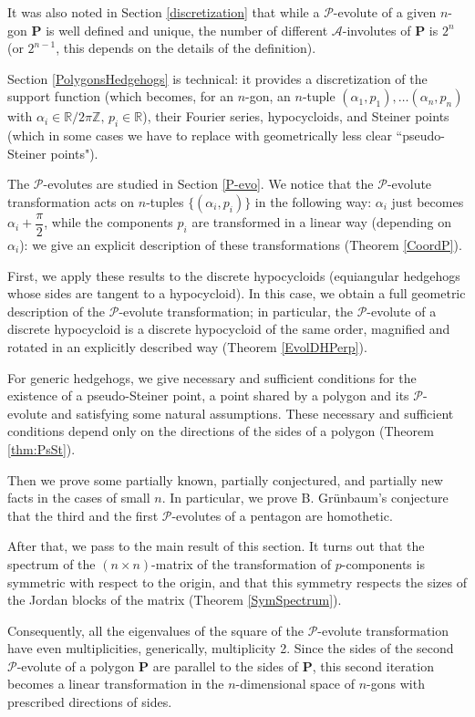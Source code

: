 \documentclass[12pt]{article}
\newcommand{\Pev}{\mathcal{P}}
\newcommand{\Aev}{\mathcal{A}}
\renewcommand{\P}{\mathbf{P}}
\begin{document}
It was also noted in Section \ref{discretization} that while a $\Pev$-evolute of a given $n$-gon $\P$ is well defined and unique, the number of different $\Aev$-involutes of $\P$ is $2^n$ (or $2^{n-1}$, this depends on the details of the definition).

Section \ref{PolygonsHedgehogs} is technical: it provides a discretization of the support function (which becomes, for an $n$-gon, an $n$-tuple $(\alpha_1,p_1),\dots(\alpha_n,p_n)$ with $\alpha_i\in{\mathbb R}/2\pi{\mathbb Z},\, p_i\in\mathbb R$), their Fourier series, hypocycloids, and Steiner points (which in some cases we have to replace with geometrically less clear ``pseudo-Steiner points"). 

The $\Pev$-evolutes are studied in Section \ref{P-evo}. We notice that the $\Pev$-evolute transformation acts on  $n$-tuples $\{(\alpha_i,p_i)\}$ in the following way: $\alpha_i$ just becomes $\alpha_i+\dfrac{\pi}2$, while the components $p_i$ are transformed in a linear way (depending on $\alpha_i$): we give an explicit description of these transformations (Theorem \ref{CoordP}). 

First, we apply these results to the discrete hypocycloids (equiangular hedgehogs whose sides are tangent to a hypocycloid). In this case, we obtain a full geometric description of the $\Pev$-evolute transformation; in particular, the $\Pev$-evolute of a discrete hypocycloid is a discrete hypocycloid of the same order, magnified and rotated in an explicitly described way (Theorem \ref{EvolDHPerp}). 

For generic hedgehogs, we give  necessary and sufficient conditions for the existence of a pseudo-Steiner point, a point shared by a polygon and its $\Pev$-evolute and satisfying some natural assumptions. These necessary and sufficient conditions depend only on the directions of the sides of a polygon (Theorem \ref{thm:PsSt}).

Then we prove some partially known, partially conjectured, and partially new facts in the cases of small $n$. In particular, we prove B. Gr\"unbaum's conjecture that the third and the first $\Pev$-evolutes of a pentagon are homothetic.

After that, we pass to the main result of this section. It turns out that the spectrum of the $(n\times n)$-matrix of the transformation of $p$-components is symmetric with respect to the origin, and that this symmetry respects the sizes of the Jordan blocks of the matrix (Theorem \ref{SymSpectrum}). 

Consequently, all the eigenvalues of the square of the $\Pev$-evolute transformation have even multiplicities, generically, multiplicity 2. Since the sides of the second $\Pev$-evolute of a polygon $\P$ are parallel to the sides of $\P$, this second iteration becomes a linear transformation in the $n$-dimensional space of $n$-gons with prescribed directions of sides. 
\end{document}
